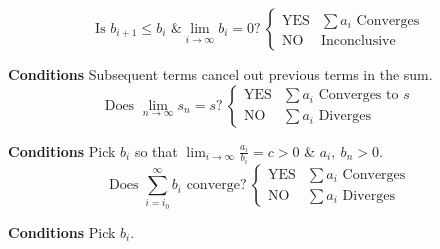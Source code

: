 \documentclass{article}
\theoremstyle{plain}
\numberwithin{theorem}{subsection}
\theoremstyle{definition}
\numberwithin{definition}{subsection}
\theoremstyle{remark}
\numberwithin{note}{subsection}
\begin{document}
\begin{multicols}{2}
\begin{mdframed}[style=exampledefaultcols,frametitle={Alternating Series}]
\begin{equation*}
			\text{Is $b_{i+1}\leqslant b_i$ \& $\lim_{i\to\infty}b_i=0$?}\:
			\begin{cases}
				\text{YES} & \text{$\sum a_i$ Converges} \\
				\text{NO} & \text{Inconclusive}
			\end{cases}
		\end{equation*}
	\end{mdframed}
	\begin{mdframed}[style=exampledefaultcols,frametitle={Telescoping Series}]
		\textbf{Conditions} Subsequent terms cancel out previous terms in the sum.
		\begin{equation*}
			\text{Does $\lim_{n\to\infty}s_n=s$?}\:
			\begin{cases}
				\text{YES} & \text{$\sum a_i$ Converges to $s$} \\
				\text{NO} & \text{$\sum a_i$ Diverges}
			\end{cases}
		\end{equation*}
	\end{mdframed}
	\begin{mdframed}[style=exampledefaultcols,frametitle={Limit Comparison Test}]
		\textbf{Conditions} Pick $b_i$ so that $\displaystyle \lim_{i\to\infty}\frac{a_i}{b_i}=c>0$ \& $a_i,\:b_n>0$.
		\begin{equation*}
			\text{Does $\sum_{i=i_0}^\infty b_i$ converge?}\:
			\begin{cases}
				\text{YES} & \text{$\sum a_i$ Converges} \\
				\text{NO} & \text{$\sum a_i$ Diverges}
			\end{cases}
		\end{equation*}
	\end{mdframed}
	\begin{mdframed}[style=exampledefaultcols,frametitle={Comparison Test}]
		\textbf{Conditions} Pick $b_i$.


\end{mdframed}
\end{multicols}
\end{document}
